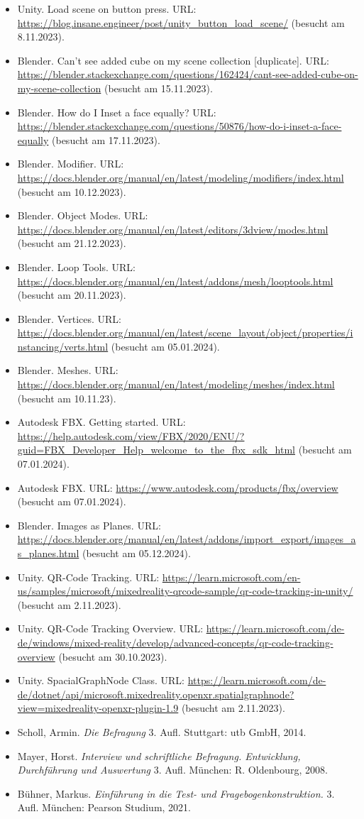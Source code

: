 \begin{itemize}
    \item Unity. Load scene on button press. URL: \url{https://blog.insane.engineer/post/unity_button_load_scene/} (besucht am 8.11.2023).
    \item Blender. Can't see added cube on my scene collection [duplicate]. URL: \url{https://blender.stackexchange.com/questions/162424/cant-see-added-cube-on-my-scene-collection} (besucht am 15.11.2023).
    \item Blender. How do I Inset a face equally? URL: \url{https://blender.stackexchange.com/questions/50876/how-do-i-inset-a-face-equally} (besucht am 17.11.2023).
    \item Blender. Modifier. URL: \url{https://docs.blender.org/manual/en/latest/modeling/modifiers/index.html} (besucht am 10.12.2023).
    \item Blender. Object Modes. URL: \url{https://docs.blender.org/manual/en/latest/editors/3dview/modes.html} (besucht am 21.12.2023).
    \item Blender. Loop Tools. URL: \url{https://docs.blender.org/manual/en/latest/addons/mesh/looptools.html} (besucht am 20.11.2023).
    \item Blender. Vertices. URL: \url{https://docs.blender.org/manual/en/latest/scene_layout/object/properties/instancing/verts.html} (besucht am 05.01.2024).
    \item Blender. Meshes. URL: \url{https://docs.blender.org/manual/en/latest/modeling/meshes/index.html} (besucht am 10.11.23).
    \item Autodesk FBX. Getting started. URL: \url{https://help.autodesk.com/view/FBX/2020/ENU/?guid=FBX_Developer_Help_welcome_to_the_fbx_sdk_html} (besucht am 07.01.2024).
    \item Autodesk FBX. URL: \url{https://www.autodesk.com/products/fbx/overview} (besucht am 07.01.2024).
    \item Blender. Images as Planes. URL: \url{https://docs.blender.org/manual/en/latest/addons/import_export/images_as_planes.html} (besucht am 05.12.2024).
    \item Unity. QR-Code Tracking. URL: \url{https://learn.microsoft.com/en-us/samples/microsoft/mixedreality-qrcode-sample/qr-code-tracking-in-unity/} (besucht am 2.11.2023).
    \item Unity. QR-Code Tracking Overview. URL: \url{https://learn.microsoft.com/de-de/windows/mixed-reality/develop/advanced-concepts/qr-code-tracking-overview} (besucht am 30.10.2023).
    \item Unity. SpacialGraphNode Class. URL: \url{https://learn.microsoft.com/de-de/dotnet/api/microsoft.mixedreality.openxr.spatialgraphnode?view=mixedreality-openxr-plugin-1.9} (besucht am 2.11.2023).
    \item Scholl, Armin. \textit{Die Befragung} 3. Aufl. Stuttgart: utb GmbH, 2014.
    \item Mayer, Horst. \textit{Interview und schriftliche Befragung. Entwicklung, Durchführung und Auswertung} 3. Aufl. München: R. Oldenbourg, 2008.
    \item Bühner, Markus. \textit{Einführung in die Test- und Fragebogenkonstruktion.} 3. Aufl. München: Pearson Studium, 2021.
\end{itemize}


